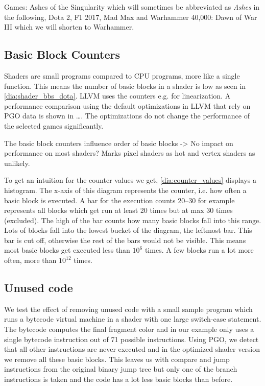 \clearpage
{}
Games: Ashes of the Singularity which will sometimes be abbreviated as \emph{Ashes} in the following, Dota 2, F1 2017, Mad Max and Warhammer 40,000: Dawn of War III which we will shorten to Warhammer.

\subsection{Basic Block Counters}
\label{sub:eval_counters}
Shaders are small programs compared to CPU programs, more like a single function. This means the number of basic blocks in a shader is low as seen in \cref{dia:shader_bbs_dota}.
LLVM uses the counters e.g. for linearization. A performance comparison using the default optimizations in LLVM that rely on PGO data is shown in \dots. The optimizations do not change the performance of the selected games significantly.

The basic block counters influence order of basic blocks -> No impact on performance on most shaders?
Marks pixel shaders as hot and vertex shaders as unlikely.

To get an intuition for the counter values we get, \cref{dia:counter_values} displays a histogram.
The x-axis of this diagram represents the counter, i.e. how often a basic block is executed.
A bar for the execution counts 20--30 for example represents all blocks which get run at least 20 times but at max 30 times (excluded).
The high of the bar counts how many basic blocks fall into this range.
Lots of blocks fall into the lowest bucket of the diagram, the leftmost bar. This bar is cut off, otherwise the rest of the bars would not be visible.
This means most basic blocks get executed less than $10^6$ times. A few blocks run a lot more often, more than $10^12$ times.




\subsection{Unused code}
\label{sub:eval_unused}
We test the effect of removing unused code with a small sample program which runs a bytecode virtual machine in a shader with one large switch-case statement.
The bytecode computes the final fragment color and in our example only uses a single bytecode instruction out of 71 possible instructions.
Using PGO, we detect that all other instructions are never executed and in the optimized shader version we remove all these basic blocks.
This leaves us with compare and jump instructions from the original binary jump tree but only one of the branch instructions is taken and the code has a lot less basic blocks than before.

